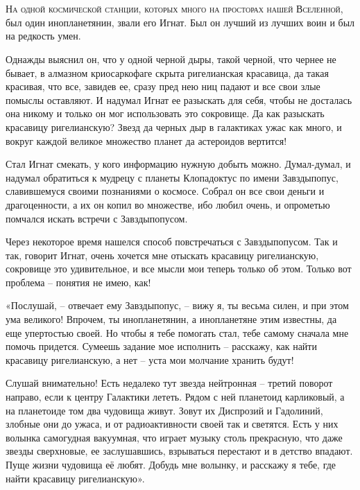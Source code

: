 \documentclass[ebook,oneside,final,openright]{memoir}
\begin{document}
\chapter{}
 \lettrine{Н}{а одной космической станции, которых много на просторах нашей Вселенной,} был один инопланетянин, звали его Игнат. Был он лучший из лучших воин и был на редкость умен.\par
\par
Однажды выяснил он, что у одной черной дыры, такой черной, что чернее не бывает, в алмазном криосаркофаге скрыта ригелианская красавица, да такая красивая, что все, завидев ее, сразу пред нею ниц падают и все свои злые помыслы оставляют. И надумал Игнат ее разыскать для себя, чтобы не досталась она никому и только он мог использовать это сокровище. Да как разыскать красавицу ригелианскую? Звезд да черных дыр в галактиках ужас как много, и вокруг каждой великое множество планет да астероидов вертится!\par
\par
Стал Игнат смекать, у кого информацию нужную добыть можно. Думал-думал, и надумал обратиться к мудрецу с планеты Клопадоктус по имени Завздыпопус, славившемуся своими познаниями о космосе. Собрал он все свои деньги и драгоценности, а их он копил во множестве, ибо любил очень, и опрометью помчался искать встречи с Завздыпопусом.\par
\par
Через некоторое время нашелся способ повстречаться с Завздыпопусом. Так и так, говорит Игнат, очень хочется мне отыскать красавицу ригелианскую, сокровище это удивительное, и все мысли мои теперь только об этом. Только вот проблема – понятия не имею, как!\par
\par
«Послушай, – отвечает ему Завздыпопус, – вижу я, ты весьма силен, и при этом ума великого! Впрочем, ты инопланетянин, а инопланетяне этим известны, да еще упертостью своей. Но чтобы я тебе помогать стал, тебе самому сначала мне помочь придется. Сумеешь задание мое исполнить – расскажу, как найти красавицу ригелианскую, а нет – уста мои молчание хранить будут!\par
\par
Слушай внимательно! Есть недалеко тут звезда нейтронная – третий поворот направо, если к центру Галактики лететь. Рядом с ней планетоид карликовый, а на планетоиде том два чудовища живут. Зовут их Диспрозий и Гадолиний, злобные они до ужаса, и от радиоактивности своей так и светятся. Есть у них волынка самогудная вакуумная, что играет музыку столь прекрасную, что даже звезды сверхновые, ее заслушавшись, взрываться перестают и в детство впадают. Пуще жизни чудовища её любят. Добудь мне волынку, и расскажу я тебе, где найти красавицу ригелианскую».\par
\end{document}
